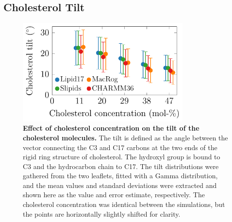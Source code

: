 \documentclass[journal=jpcbfk]{achemso}
\begin{document}
\clearpage
\subsection{Cholesterol Tilt}

\begin{figure}[htb!]
    \centering
    \includegraphics[width=8.7cm]{../FIGS/choltilt.pdf}
    \caption{\label{SIfig:choltilt}%
     \textbf{Effect of cholesterol concentration on the tilt of the cholesterol molecules.}
     The tilt is defined as the angle between the vector connecting the C3 and C17 carbons at the two ends of the rigid ring structure of cholesterol. The hydroxyl group is bound to C3 and the hydrocarbon chain to C17. The tilt distributions were gathered from the two leaflets, fitted with a Gamma distribution, and the mean values and standard deviations were extracted and shown here as the value and error estimate, respectively. The cholesterol concentration was identical between the simulations, but the points are horizontally slightly shifted for clarity.
    }
\end{figure}

\clearpage



\end{document}
